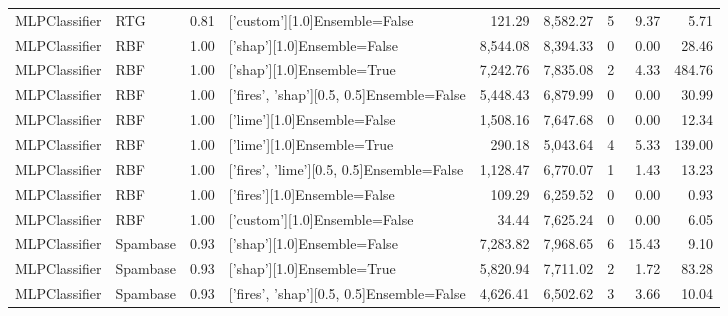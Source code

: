 \begin{tabular}{llrlrrlrr}
      MLPClassifier &            RTG &      0.81 &             ['custom'][1.0]Ensemble=False &     121.29 &                 8,582.27 &               5 &               9.37 &   5.71 \\
      MLPClassifier &            RBF &      1.00 &               ['shap'][1.0]Ensemble=False &   8,544.08 &                 8,394.33 &               0 &               0.00 &  28.46 \\
      MLPClassifier &            RBF &      1.00 &                ['shap'][1.0]Ensemble=True &   7,242.76 &                 7,835.08 &               2 &               4.33 & 484.76 \\
      MLPClassifier &            RBF &      1.00 & ['fires', 'shap'][0.5, 0.5]Ensemble=False &   5,448.43 &                 6,879.99 &               0 &               0.00 &  30.99 \\
      MLPClassifier &            RBF &      1.00 &               ['lime'][1.0]Ensemble=False &   1,508.16 &                 7,647.68 &               0 &               0.00 &  12.34 \\
      MLPClassifier &            RBF &      1.00 &                ['lime'][1.0]Ensemble=True &     290.18 &                 5,043.64 &               4 &               5.33 & 139.00 \\
      MLPClassifier &            RBF &      1.00 & ['fires', 'lime'][0.5, 0.5]Ensemble=False &   1,128.47 &                 6,770.07 &               1 &               1.43 &  13.23 \\
      MLPClassifier &            RBF &      1.00 &              ['fires'][1.0]Ensemble=False &     109.29 &                 6,259.52 &               0 &               0.00 &   0.93 \\
      MLPClassifier &            RBF &      1.00 &             ['custom'][1.0]Ensemble=False &      34.44 &                 7,625.24 &               0 &               0.00 &   6.05 \\
      MLPClassifier &       Spambase &      0.93 &               ['shap'][1.0]Ensemble=False &   7,283.82 &                 7,968.65 &               6 &              15.43 &   9.10 \\
      MLPClassifier &       Spambase &      0.93 &                ['shap'][1.0]Ensemble=True &   5,820.94 &                 7,711.02 &               2 &               1.72 &  83.28 \\
      MLPClassifier &       Spambase &      0.93 & ['fires', 'shap'][0.5, 0.5]Ensemble=False &   4,626.41 &                 6,502.62 &               3 &               3.66 &  10.04 \\

\end{tabular}
